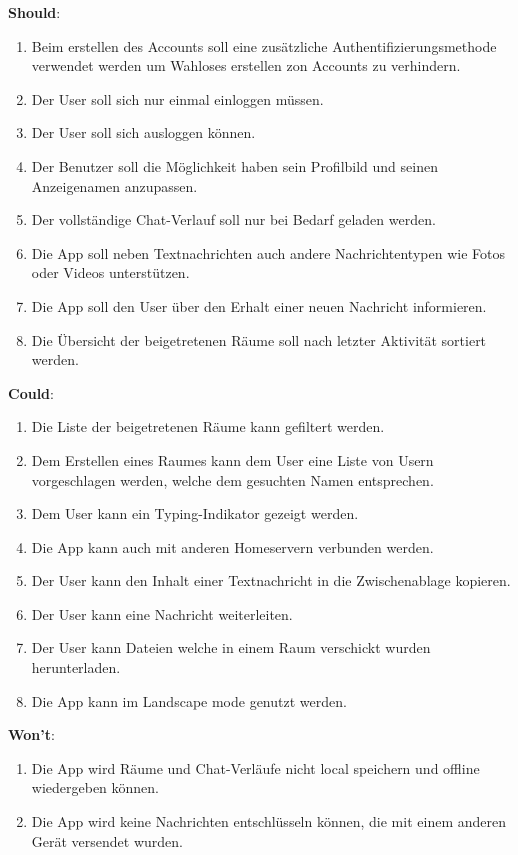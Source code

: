     \textbf{Should}:
    \begin{enumerate}[label={\roman*.}, leftmargin=2.5cm]
        \item Beim erstellen des Accounts soll eine zusätzliche Authentifizierungsmethode verwendet werden um Wahloses erstellen zon Accounts zu verhindern.
        \item Der User soll sich nur einmal einloggen müssen.
        \item Der User soll sich ausloggen können.
        \item Der Benutzer soll die Möglichkeit haben sein Profilbild und seinen Anzeigenamen anzupassen.
        \item Der vollständige Chat-Verlauf soll nur bei Bedarf geladen werden.
        \item Die App soll neben Textnachrichten auch andere Nachrichtentypen wie Fotos oder Videos unterstützen.
        \item Die App soll den User über den Erhalt einer neuen Nachricht informieren.
        \item Die Übersicht der beigetretenen Räume soll nach letzter Aktivität sortiert werden.
    \end{enumerate}


    \textbf{Could}:
    \begin{enumerate}[label={\roman*.}, leftmargin=2.5cm]
        \item Die Liste der beigetretenen Räume kann gefiltert werden.
        \item Dem Erstellen eines Raumes kann dem User eine Liste von Usern vorgeschlagen werden, welche dem gesuchten Namen entsprechen.
        \item Dem User kann ein Typing-Indikator gezeigt werden.
        \item Die App kann auch mit anderen Homeservern verbunden werden.
        \item Der User kann den Inhalt einer Textnachricht in die Zwischenablage kopieren.
        \item Der User kann eine Nachricht weiterleiten.
        \item Der User kann Dateien welche in einem Raum verschickt wurden herunterladen.
        \item Die App kann im Landscape mode genutzt werden.
    \end{enumerate}

    \textbf{Won't}:
    \begin{enumerate}[label={\roman*.}, leftmargin=2.5cm]
        \item Die App wird Räume und Chat-Verläufe nicht local speichern und offline wiedergeben können.
        \item Die App wird keine Nachrichten entschlüsseln können, die mit einem anderen Gerät versendet wurden.
    \end{enumerate}

